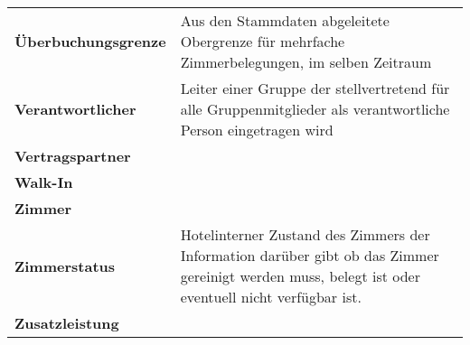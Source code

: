 \documentclass[../Pflichtenheft.tex]{subfiles}
\begin{document}
\begin{longtable}{p{5cm} p{10cm}}
        \textbf{Überbuchungsgrenze} & Aus den Stammdaten abgeleitete Obergrenze für mehrfache Zimmerbelegungen, im selben Zeitraum \\[0.5cm]
        \textbf{Verantwortlicher} & Leiter einer Gruppe der stellvertretend für alle Gruppenmitglieder als verantwortliche Person eingetragen wird \\[0.5cm]
        \textbf{Vertragspartner} & \\[0.5cm]
        \textbf{Walk-In} & \\[0.5cm]
        \textbf{Zimmer} & \\[0.5cm]
        \textbf{Zimmerstatus} & Hotelinterner Zustand des Zimmers der Information darüber gibt ob das Zimmer gereinigt werden muss, belegt ist oder eventuell nicht verfügbar ist. \\[0.5cm]
        \textbf{Zusatzleistung} & \\[0.5cm]
    \end{longtable}
\end{document}
